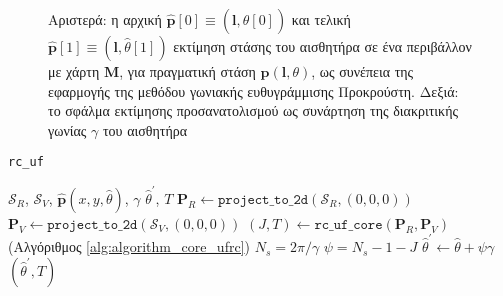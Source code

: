 \begin{figure}[!h]\centering
  \vspace{0.5cm}
  
  \vspace{0.5cm}
  \caption{\small Αριστερά: η αρχική
           $\hat{\bm{p}}[0] \equiv (\bm{l},\hat{\theta}[0])$ και τελική
           $\hat{\bm{p}}[1] \equiv (\bm{l},\hat{\theta}[1])$ εκτίμηση στάσης του
           αισθητήρα σε ένα περιβάλλον με χάρτη $\bm{M}$, για πραγματική στάση
           $\bm{p}(\bm{l},\theta)$, ως συνέπεια της εφαρμογής της μεθόδου
           γωνιακής ευθυγράμμισης Προκρούστη. Δεξιά: το σφάλμα εκτίμησης
           προσανατολισμού ως συνάρτηση της διακριτικής γωνίας $\gamma$ του
           αισθητήρα}
  \label{fig:02_04_02:rc_uf}
\end{figure}


\begin{algorithm}[!h]
  \caption{\texttt{rc\_uf}}
  \label{alg:algorithm_ufrc}
  \begin{spacing}{1.3}
  \begin{algorithmic}[1]
    \REQUIRE $\mathcal{S}_R$, $\mathcal{S}_V$, $\hat{\bm{p}}(x, y, \hat{\theta})$, $\gamma$
    \ENSURE $\hat{\theta}^\prime$, $T$
    \STATE $\bm{P}_R \leftarrow \texttt{project\_to\_2d}(\mathcal{S}_R, (0,0,0))$
    \STATE $\bm{P}_V \leftarrow \texttt{project\_to\_2d}(\mathcal{S}_V, (0,0,0))$
    \STATE $(J,T) \leftarrow \texttt{rc\_uf\_core}(\bm{P}_R, \bm{P}_V)$ \hfill (Αλγόριθμος \ref{alg:algorithm_core_ufrc})
    \STATE $N_s = 2 \pi / \gamma$
    \STATE $\psi = N_s - 1 - J$
    \STATE $\hat{\theta}^\prime \leftarrow \hat{\theta} + \psi \gamma$
    \RETURN $(\hat{\theta}^\prime, T)$
  \end{algorithmic}
  \end{spacing}
\end{algorithm}


